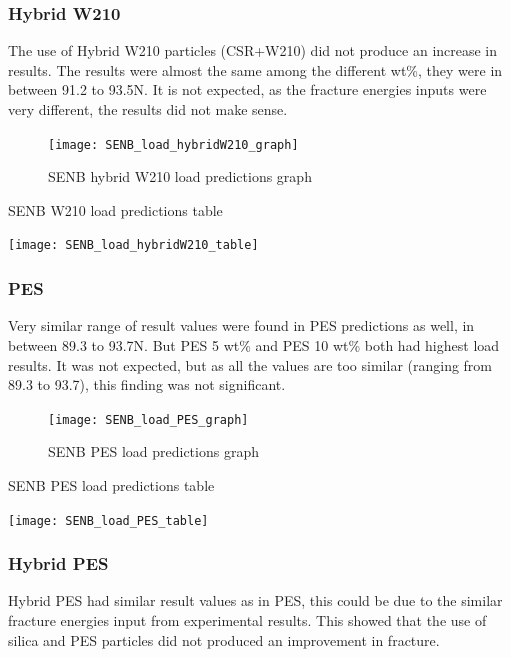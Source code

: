 \documentclass[numbers=noendperiod,chapterprefix=on]{icldt} %
\begin{document}
\subsubsection{Hybrid W210}
The use of Hybrid W210 particles (CSR+W210) did not produce an increase in results. The results were almost the same among the different wt\%, they were in between 91.2 to 93.5N. It is not expected, as the fracture energies inputs were very different, the results did not make sense.

\begin{figure}[!hp]
  \centering
  \texttt{[image: SENB\_load\_hybridW210\_graph]}\label{SENB_load_hybridW210_graph}
  \caption{SENB hybrid W210 load predictions graph}
  \end{figure}
  \FloatBarrier
 
 \begin{table}
   \centering
   \caption{SENB W210 load predictions table}\label{SENB_load_hybridW210_table}
   \texttt{[image: SENB\_load\_hybridW210\_table]}
   \end{table}
   \FloatBarrier
   
\subsubsection{PES}   
Very similar range of result values were found in PES predictions as well, in between 89.3 to 93.7N. But PES 5 wt\% and PES 10 wt\% both had highest load results. It was not expected, but as all the values are too similar (ranging from 89.3 to 93.7), this finding was not significant.

\begin{figure}[!hp]
  \centering
  \texttt{[image: SENB\_load\_PES\_graph]}\label{SENB_load_PES_graph}
  \caption{SENB PES load predictions graph}
  \end{figure}
  \FloatBarrier
 
 \begin{table}
   \centering
   \caption{SENB PES load predictions table}\label{SENB_load_PES_table}
   \texttt{[image: SENB\_load\_PES\_table]}
   \end{table}
   \FloatBarrier

\subsubsection{Hybrid PES}
Hybrid PES had similar result values as in PES, this could be due to the similar fracture energies input from experimental results. This showed that the use of silica and PES particles did not produced an improvement in fracture. 
\end{document}
